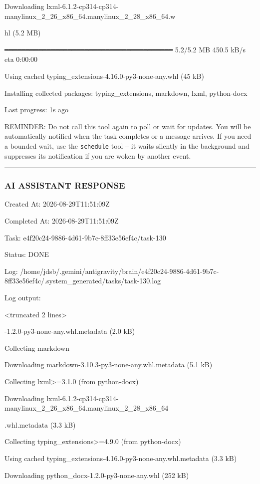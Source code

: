 \documentclass[11pt,a4paper]{article}
\begin{document}
{Downloading lxml-6.1.2-cp314-cp314-manylinux\_2\_26\_x86\_64.manylinux\_2\_28\_x86\_64.w

hl (5.2 MB)

━━━━━━━━━━━━━━━━━━━━━━━━━━━━━━━━━━━━━━━━ 5.2/5.2 MB 450.5 kB/s eta 0:00:00

Using cached typing\_extensions-4.16.0-py3-none-any.whl (45 kB)

Installing collected packages: typing\_extensions, markdown, lxml, python-docx


Last progress: 1s ago



REMINDER: Do not call this tool again to poll or wait for updates. You will be automatically notified when the task completes or a message arrives. If you need a bounded wait, use the \texttt{schedule} tool -- it waits silently in the background and suppresses its notification if you are woken by another event.


\hrule

\subsubsection{AI ASSISTANT RESPONSE}

Created At: 2026-08-29T11:51:09Z

Completed At: 2026-08-29T11:51:09Z

Task: e4f20c24-9886-4d61-9b7c-8ff33e56ef4c/task-130

Status: DONE

Log: /home/jdsb/.gemini/antigravity/brain/e4f20c24-9886-4d61-9b7c-8ff33e56ef4c/.system\_generated/tasks/task-130.log

Log output:

<truncated 2 lines>

-1.2.0-py3-none-any.whl.metadata (2.0 kB)

Collecting markdown

Downloading markdown-3.10.3-py3-none-any.whl.metadata (5.1 kB)

Collecting lxml>=3.1.0 (from python-docx)

Downloading lxml-6.1.2-cp314-cp314-manylinux\_2\_26\_x86\_64.manylinux\_2\_28\_x86\_64

.whl.metadata (3.3 kB)

Collecting typing\_extensions>=4.9.0 (from python-docx)

Using cached typing\_extensions-4.16.0-py3-none-any.whl.metadata (3.3 kB)

Downloading python\_docx-1.2.0-py3-none-any.whl (252 kB)

}
\end{document}
